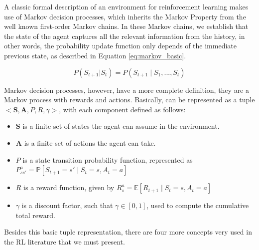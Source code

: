 A classic formal description of an environment for reinforcement learning makes use of Markov decision processes, which inherits the Markov Property from the well known first-order Markov chains. In these Markov chains, we establish that the state of the agent captures all the relevant information from the history, in other words, the probability update function only depends of the immediate previous state, as described in Equation \eqref{eq:markov_basic}.

\begin{equation}
P(S_{t+1} | S_t) = P(S_{t+1} \mid S_1, ..., S_t)
\label{eq:markov_basic}
\end{equation}

Markov decision processes, however, have a more complete definition, they are a Markov process with rewards and actions. Basically, can be represented as a tuple $<\textbf{S}, \textbf{A}, P, R, \gamma>$, with each component defined as follows:
\begin{itemize}
\item
	$\textbf{S}$ is a finite set of states the agent can assume in the environment.
\item
	$\textbf{A}$ is a finite set of actions the agent can take.
\item
	$P$ is a state transition probability function, represented as $P_{ss'}^a = \mathbb{P}[S_{t+1}=s' \mid S_t = s, A_t = a]$
\item
	$R$ is a reward function, given by $R_s^a = \mathbb{E}[R_{t+1} \mid S_t = s, A_t = a]$
\item
	$\gamma$ is a discount factor, such that $\gamma \in [0,1]$, used to compute the cumulative total reward.
	
\end{itemize}

Besides this basic tuple representation, there are four more concepts very used in the RL literature that we must present.

